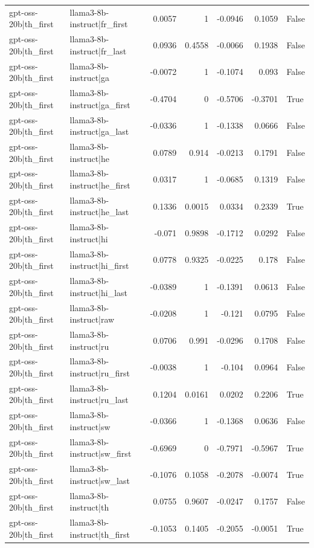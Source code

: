 \begin{table}
\begin{tabular}{l l r r r r l}
gpt-oss-20b|th_first & llama3-8b-instruct|fr_first & 0.0057 & 1 & -0.0946 & 0.1059 & False \\
gpt-oss-20b|th_first & llama3-8b-instruct|fr_last & 0.0936 & 0.4558 & -0.0066 & 0.1938 & False \\
gpt-oss-20b|th_first & llama3-8b-instruct|ga & -0.0072 & 1 & -0.1074 & 0.093 & False \\
gpt-oss-20b|th_first & llama3-8b-instruct|ga_first & -0.4704 & 0 & -0.5706 & -0.3701 & True \\
gpt-oss-20b|th_first & llama3-8b-instruct|ga_last & -0.0336 & 1 & -0.1338 & 0.0666 & False \\
gpt-oss-20b|th_first & llama3-8b-instruct|he & 0.0789 & 0.914 & -0.0213 & 0.1791 & False \\
gpt-oss-20b|th_first & llama3-8b-instruct|he_first & 0.0317 & 1 & -0.0685 & 0.1319 & False \\
gpt-oss-20b|th_first & llama3-8b-instruct|he_last & 0.1336 & 0.0015 & 0.0334 & 0.2339 & True \\
gpt-oss-20b|th_first & llama3-8b-instruct|hi & -0.071 & 0.9898 & -0.1712 & 0.0292 & False \\
gpt-oss-20b|th_first & llama3-8b-instruct|hi_first & 0.0778 & 0.9325 & -0.0225 & 0.178 & False \\
gpt-oss-20b|th_first & llama3-8b-instruct|hi_last & -0.0389 & 1 & -0.1391 & 0.0613 & False \\
gpt-oss-20b|th_first & llama3-8b-instruct|raw & -0.0208 & 1 & -0.121 & 0.0795 & False \\
gpt-oss-20b|th_first & llama3-8b-instruct|ru & 0.0706 & 0.991 & -0.0296 & 0.1708 & False \\
gpt-oss-20b|th_first & llama3-8b-instruct|ru_first & -0.0038 & 1 & -0.104 & 0.0964 & False \\
gpt-oss-20b|th_first & llama3-8b-instruct|ru_last & 0.1204 & 0.0161 & 0.0202 & 0.2206 & True \\
gpt-oss-20b|th_first & llama3-8b-instruct|sw & -0.0366 & 1 & -0.1368 & 0.0636 & False \\
gpt-oss-20b|th_first & llama3-8b-instruct|sw_first & -0.6969 & 0 & -0.7971 & -0.5967 & True \\
gpt-oss-20b|th_first & llama3-8b-instruct|sw_last & -0.1076 & 0.1058 & -0.2078 & -0.0074 & True \\
gpt-oss-20b|th_first & llama3-8b-instruct|th & 0.0755 & 0.9607 & -0.0247 & 0.1757 & False \\
gpt-oss-20b|th_first & llama3-8b-instruct|th_first & -0.1053 & 0.1405 & -0.2055 & -0.0051 & True \\

\end{tabular}
\end{table}
